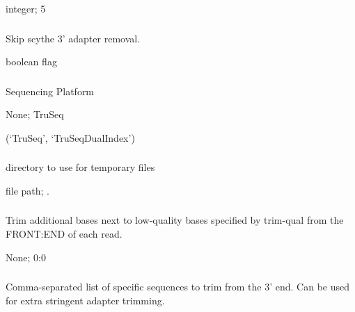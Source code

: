 \documentclass[letterpaper,11pt,english]{sphinxmanual}
\begin{document}
 integer;  5


\subsubsection{}
\label{\detokenize{prog_desc:scythe-skip}}
 Skip scythe 3’ adapter removal.

 boolean flag


\subsubsection{}
\label{\detokenize{prog_desc:t-platform}}
 Sequencing Platform

 None;  TruSeq

 (‘TruSeq’, ‘TruSeqDualIndex’)


\subsubsection{}
\label{\detokenize{prog_desc:temp-dir}}
 directory to use for temporary files

 file path;  .


\subsubsection{}
\label{\detokenize{prog_desc:trim-qual-pad}}
 Trim additional bases next to low-quality bases specified by \textendash{}trim-qual from the FRONT:END of each read.

 None;  0:0


\subsubsection{}
\label{\detokenize{prog_desc:z-trim-pattern-3}}
 Comma-separated list of specific sequences to trim from the 3’ end. Can be used for extra stringent adapter trimming.
\end{document}
